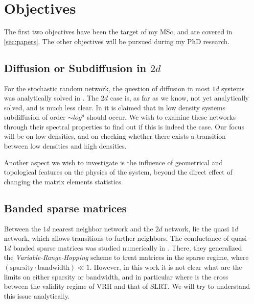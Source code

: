\chapter{Objectives}


The first two objectives have been the target of my MSc, and are covered in 
\autoref{sec:papers}. The other objectives will be pursued during my PhD research.


\section{Diffusion or Subdiffusion in $2d$}

For the stochastic random network, the question of diffusion in most $1d$
systems was analytically solved in \cite{alexander_excitation_1981}. 
The $2d$ case is, as far as we know, not yet analytically solved, and is much less clear. 
In \cite{amir_localization_2010} it is claimed that in low density systems subdiffusion of
order $\sim log^d$ should occur. We wish to examine these networks through their spectral
properties to find out if this is indeed the case. Our focus will be on low densities,
and on checking whether there exists a transition between low densities and high densities.

Another aspect we wish to investigate is the influence of geometrical and 
topological features on the physics of the system, beyond the direct 
effect of changing the matrix elements statistics.

\section{Banded sparse matrices}


Between the $1d$ nearest neighbor network and the $2d$ network,
lie the quasi $1d$ network, which allows transitions to further neighbors.
The conductance of quasi-$1d$ banded sparse matrices was studied
numerically in \cite{stotland_random-matrix_2010}.
There, they generalized the \emph{Variable-Range-Hopping} scheme to treat 
matrices in the sparse regime, where 
$(\text{sparsity}\cdot \text{bandwidth}) \ll 1$. 
However, in this work it is not clear what are the limits on either
sparsity or bandwidth, and in particular where is the cross between the 
validity regime of VRH and that of SLRT. We will try to understand this
issue analytically.



